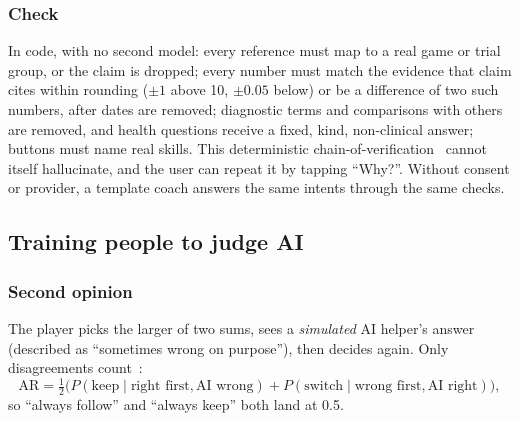\documentclass[11pt,a4paper]{article}
\begin{document}
\subsubsection{Check} In code, with no second model: every reference must map to a real game or trial group, or the claim is dropped; every number must match the evidence that claim cites within rounding ($\pm1$ above 10, $\pm0.05$ below) or be a difference of two such numbers, after dates are removed; diagnostic terms and comparisons with others are removed, and health questions receive a fixed, kind, non-clinical answer; buttons must name real skills. This deterministic chain-of-verification~\cite{cove} cannot itself hallucinate, and the user can repeat it by tapping ``Why?''. Without consent or provider, a template coach answers the same intents through the same checks.

\subsection{Training people to judge AI}

\subsubsection{Second opinion} The player picks the larger of two sums, sees a \emph{simulated} AI helper's answer (described as ``sometimes wrong on purpose''), then decides again. Only disagreements count~\cite{schemmer}:
\begin{equation}
\text{AR}=\tfrac12\Big(P(\text{keep}\mid\text{right first},\text{AI wrong})+P(\text{switch}\mid\text{wrong first},\text{AI right})\Big),
\end{equation}
so ``always follow'' and ``always keep'' both land at 0.5.
\end{document}
